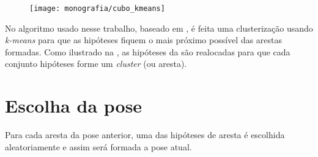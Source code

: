 \begin{figure}[ht!]
\centering
\texttt{[image: monografia/cubo\_kmeans]}
\caption{}
\label{cubo_kmeans}
\end{figure}

No algoritmo usado nesse trabalho, baseado em \cite{celine}, é feita uma clusterização usando \emph{k-means} para que as hipóteses fiquem o mais próximo possível das arestas formadas. Como ilustrado na , as hipóteses da  são realocadas para que cada conjunto hipóteses forme um \emph{cluster} (ou aresta).

\section{Escolha da pose}

Para cada aresta da pose anterior, uma das hipóteses de aresta é escolhida aleatoriamente e assim será formada a pose atual.

\begin{comment}
\section{A FAZER}

\begin{enumerate}
\item Descrever o moving-edges. Mostrar que com múltiplas hipóteses a $n$-ésima hipótese de ponto vai corresponder à $n$-ésima hipótese de aresta.
\item Falar sobre \cite{celine}. As hipóteses de pontos vão formar arestas tal que elas fiquem as mais paralelas possíveis da aresta da cena atual.
\item colocar figuras para ilustrar
\end{enumerate}
\end{comment}
